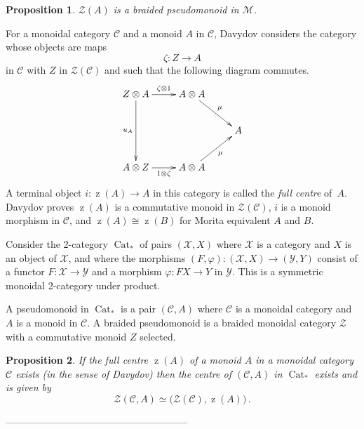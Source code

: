 \documentclass[a4paper,12pt]{article}
\newtheorem*{Proposition}{Proposition}
\theoremstyle{definition}
\theoremstyle{fact}
\theoremstyle{genquest}
\theoremstyle{step}
\newcommand{\Cat}{\operatorname{Cat}}
\newcommand{\catC}{\mathcal{C}}
\newcommand{\funcM}{\mathcal{M}}
\newcommand{\catX}{\mathcal{X}}
\newcommand{\catY}{\mathcal{Y}}
\newcommand{\catZ}{\mathcal{Z}}%
\newcommand{\cntrZ}{\mathcal{Z}}%
\newcommand{\zz}{\operatorname{z}}
\begin{document}
\begin{Proposition}
$\cntrZ(A)$ is a braided pseudomonoid in $\funcM$.
\end{Proposition}


For a monoidal category $\catC$ and a monoid $A$ in $\catC$, Davydov considers the category whose objects are maps
\[
\zeta : Z \to A
\]
in $\catC$ with $Z$ in $\catZ(\catC)$ and such that the following diagram commutes.
\[
 \xymatrix{Z\otimes A \ar[dd]_-{u_A}   \ar[r]^-{\zeta \otimes 1} & A\otimes A  \ar[rd]^-\mu
\\
&& A
\\
A\otimes Z   \ar[r]_-{1\otimes \zeta} & A\otimes A  \ar[ru]_-\mu
}
\]
A terminal object $i : \zz(A) \to A$ in this category is called the \emph{full centre} of~$A$.   
Davydov proves $\zz(A)$ is a commutative monoid in $\catZ(\catC)$, 
$i$ is a monoid morphism in $\catC$, and $\zz(A) \cong \zz(B)$ for Morita equivalent $A$ and $B$.

\medskip

Consider the 2-category $\Cat_\ast$ of pairs $(\catX,X)$ where $\catX$ is a category and $X$ is an object of $\catX$, 
and where the morphisms $(F,\varphi) : (\catX,X) \to (\catY,Y)$ consist of 
a functor $F : \catX \to \catY$ and a morphism $\varphi : FX \to Y$ in $\catY$.  
This is a symmetric monoidal 2-category under product.

A pseudomonoid in $\Cat_\ast$ is a pair $(\catC,A)$ where $\catC$ is a monoidal category and $A$ is a monoid in $\catC$.  
A braided pseudomonoid is a braided monoidal category $\catZ$ with a commutative monoid $Z$ selected.

\begin{Proposition}
If the full centre $\zz(A)$ of a monoid $A$ in a monoidal category $\catC$ exists (in the sense of Davydov) 
then the centre of $(\catC,A)$ in  $\Cat_\ast$ exists and is given by
\[
\catZ (\catC,A) \simeq \bigl(\catZ(\catC),\zz(A)\bigr)\,.
\]
\end{Proposition}


\begin{center}
--------------------------------------------------------
\end{center}
\end{document}
